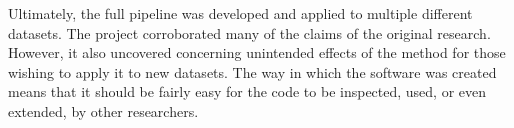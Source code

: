 \documentclass[12pt]{article}
\begin{document}
Ultimately, the full pipeline was developed and applied to multiple different datasets.
The project corroborated many of the claims of the original research.
However, it also uncovered concerning unintended effects of the method for those wishing to apply it to new datasets.
The way in which the software was created means that it should be fairly easy for the code to be inspected,
used, or even extended, by other researchers.

\newpage



\end{document}
